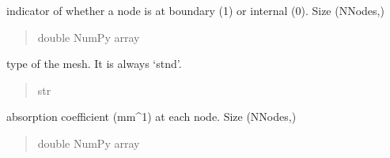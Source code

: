 \documentclass[letterpaper,10pt,english]{sphinxmanual}
\begin{document}
\begin{fulllineitems}
\begin{fulllineitems}
\begin{quote}
\begin{description}
\end{description}\end{quote}

\end{fulllineitems}


\begin{fulllineitems}
\label{\detokenize{_autosummary/nirfasterff.base.stnd_mesh.stndmesh:nirfasterff.base.stnd_mesh.stndmesh.bndvtx}}
\pysigstartsignatures
\pysigline
{}
\pysigstopsignatures
\sphinxAtStartPar
indicator of whether a node is at boundary (1) or internal (0). Size (NNodes,)
\begin{quote}\begin{description}
\sphinxAtStartPar
double NumPy array

\end{description}\end{quote}

\end{fulllineitems}


\begin{fulllineitems}
\label{\detokenize{_autosummary/nirfasterff.base.stnd_mesh.stndmesh:nirfasterff.base.stnd_mesh.stndmesh.type}}
\pysigstartsignatures
\pysigline
{}
\pysigstopsignatures
\sphinxAtStartPar
type of the mesh. It is always ‘stnd’.
\begin{quote}\begin{description}
\sphinxAtStartPar
str

\end{description}\end{quote}

\end{fulllineitems}


\begin{fulllineitems}
\label{\detokenize{_autosummary/nirfasterff.base.stnd_mesh.stndmesh:nirfasterff.base.stnd_mesh.stndmesh.mua}}
\pysigstartsignatures
\pysigline
{}
\pysigstopsignatures
\sphinxAtStartPar
absorption coefficient (mm\textasciicircum{}\sphinxhyphen{}1) at each node. Size (NNodes,)
\begin{quote}\begin{description}
\sphinxAtStartPar
double NumPy array


\end{description}
\end{quote}
\end{fulllineitems}
\end{fulllineitems}
\end{document}
